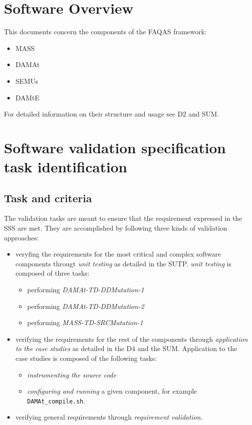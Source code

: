 \chapter{Software Overview}

This documents concern the components of the FAQAS framework:
\begin{itemize}
  \item MASS
  \item DAMAt
  \item SEMUs
  \item DAMtE
\end{itemize}

For detailed information on their structure and usage see D2 and SUM.

\chapter{Software validation specification task identification}

\section{Task and criteria}

The validation tasks are meant to ensure that the requirement expressed in the SSS are met.
They are accomplished by following three kinds of validation approaches:
\begin{itemize}
  \item veryfing the requirements for the most critical and complex software components througt \emph{unit testing} as detailed in the SUTP.
  \emph{unit testing} is composed of three tasks:
  \begin{itemize}
    \item performing \emph{DAMAt-TD-DDMutation-1}
    \item performing \emph{DAMAt-TD-DDMutation-2}
    \item performing \emph{MASS-TD-SRCMutation-1}
  \end{itemize}
  \item verifying the requirements for the rest of the components through \emph{application to the case studies} as detailed in the D4 and the SUM.
  Application to the case studies is composed of the following tasks:
  \begin{itemize}
    \item \emph{instrumenting the source code}
    \item \emph{configuring and running} a given component, for example \texttt{DAMAt\_compile.sh}.
  \end{itemize}
  \item verifying general requirements through \emph{requirement validation}.
\end{itemize}

